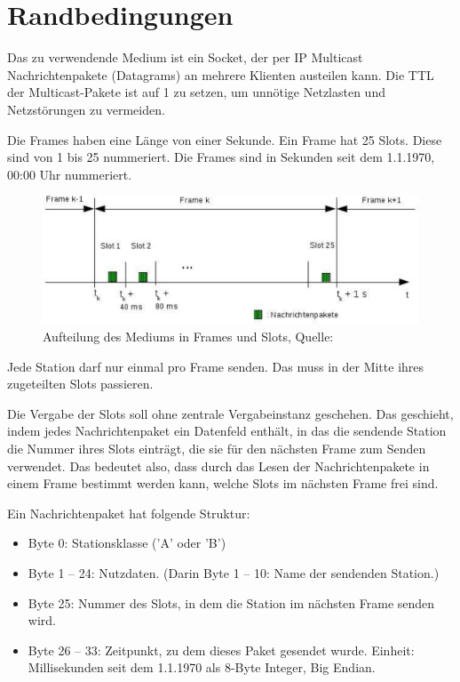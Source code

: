 \documentclass[draft=false
              ,paper=a4
              ,twoside=false
              ,fontsize=11pt
              ,headsepline
              ,BCOR10mm
              ,DIV11
              ]{scrbook}
\begin{document}
\section{Randbedingungen}
Das zu verwendende Medium ist ein Socket, der per IP Multicast Nachrichtenpakete (Datagrams) an mehrere Klienten austeilen kann. Die TTL der Multicast-Pakete ist auf 1 zu setzen, um unnötige Netzlasten und Netzstörungen zu vermeiden.

Die Frames haben eine Länge von einer Sekunde. Ein Frame hat 25 Slots. Diese sind von 1 bis 25 nummeriert. Die Frames sind in
Sekunden seit dem 1.1.1970, 00:00 Uhr nummeriert.

\begin{figure}[h]
\centering
\includegraphics[width=\textwidth]{frame-structure.png}
\caption[frame-structure]{Aufteilung des Mediums in Frames und Slots, Quelle: \cite{exercise}}
\label{fig:frame-structure}
\end{figure}

Jede Station darf nur einmal pro Frame senden. Das muss in der Mitte ihres zugeteilten Slots passieren.

Die Vergabe der Slots soll ohne zentrale Vergabeinstanz geschehen. Das geschieht, indem jedes Nachrichtenpaket ein Datenfeld enthält, in das die sendende Station die Nummer ihres Slots einträgt, die sie für den nächsten Frame zum Senden verwendet.
Das bedeutet also, dass durch das Lesen der Nachrichtenpakete in einem Frame bestimmt werden kann, welche Slots im nächsten Frame frei sind.

Ein Nachrichtenpaket hat folgende Struktur:
\begin{itemize}
	\item Byte 0: Stationsklasse ('A' oder 'B')
	\item Byte 1 – 24: Nutzdaten. (Darin Byte 1 – 10: Name der sendenden Station.)
	\item Byte 25: Nummer des Slots, in dem die Station im nächsten Frame senden wird.
	\item Byte 26 – 33: Zeitpunkt, zu dem dieses Paket gesendet wurde. Einheit: Millisekunden seit dem 1.1.1970 als 8-Byte Integer, Big Endian.
\end{itemize}
\end{document}
